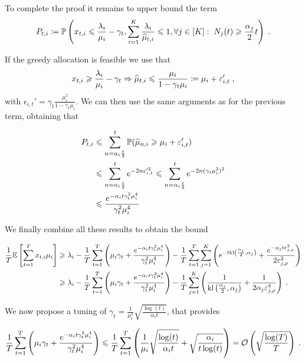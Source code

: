 To complete the proof it remains to upper bound the term \[P_{t,i} \coloneqq \mathbb{P}\left(x_{t,i}\leqslant \frac{\lambda_i}{\mu_i}-\gamma_t, \sum_{i=1}^K \frac{\lambda_i}{\widehat{\mu}_{t, i}}\leqslant 1, \forall j \in [K]:\; N_j(t)\geqslant \frac{\alpha_j}{2}t\right) \;.\]

If the greedy allocation is feasible we use that
\[x_{t,i} \geqslant \frac{\lambda_i}{\mu_i} - \gamma_t \Rightarrow \widehat{\mu}_{t,i} \leqslant \frac{\mu_i}{1-\gamma_t \mu_i} \coloneqq \mu_i + \varepsilon_{i, t}' \;, \]
with $\epsilon_{i, t}'= \gamma_t \frac{\mu_i^2}{1-\gamma_t\mu_i}$. We can then use the same arguments as for the previous term, obtaining that 

\begin{align*}
P_{t,i} &\leqslant \sum_{n = \alpha_i \frac{t}{2}}^t \mathbb{P}(\widehat{\mu}_{n,i}\geqslant \mu_i + \varepsilon_{i, t}') \\
& \leqslant \sum_{n = \alpha_i \frac{t}{2}}^t e^{-2n \varepsilon_{i, t}'^2} \leqslant \sum_{n = \alpha_i \frac{t}{2}}^t e^{-2n (\gamma_t \mu_i^2)^2} \\
& \leqslant \frac{e^{-\alpha_i t \gamma_t^2 \mu_i^4}}{\gamma_t^2 \mu_i^4}
\end{align*}

We finally combine all these results to obtain the bound 

\begin{align*} 
\frac{1}{T} \mathbb{E}\left[\sum_{t=1}^T x_{t,i} \mu_i \right] &\geqslant \lambda_i - \frac{1}{T} \sum_{t=1}^T \left(\mu_i \gamma_t + \frac{e^{-\alpha_i t \gamma_t^2 \mu_i^4}}{\gamma_t^2 \mu_i^4}\right) - \frac{1}{T} \sum_{t=1}^T  \sum_{j=1}^K \left(e^{-t \text{\normalfont kl}\left(\frac{\alpha_j}{2}, \alpha_j\right)}+ \frac{e^{-\alpha_j t \varepsilon_{j, \rho}^2}}{2\varepsilon_{j, \rho}^2}\right) \\
& \geqslant \lambda_i - \frac{1}{T} \sum_{t=1}^T \left(\mu_i \gamma_t + \frac{e^{-\alpha_i t \gamma_t^2 \mu_i^4}}{\gamma_t^2 \mu_i^4}\right) - \frac{1}{T}\sum_{j=1}^K \left(\frac{1}{\text{\normalfont kl}\left(\frac{\alpha_j}{2}, \alpha_j\right)}+ \frac{1}{2 \alpha_j \varepsilon_{j, \rho}^4}\right) \;.
\end{align*}

We now propose a tuning of $\gamma_t = \frac{1}{\mu_i^2}\sqrt{\frac{\log(t)}{\alpha_i t}}$, that provides 

\[\frac{1}{T} \sum_{t=1}^T \left(\mu_i \gamma_t + \frac{e^{-\alpha_i t \gamma_t^2 \mu_i^4}}{\gamma_t^2 \mu_i^4}\right) \leqslant \frac{1}{T} \sum_{t=1}^T \left(\frac{1}{\mu_i}\sqrt{\frac{\log(t)}{\alpha_i t}} + \sqrt{\frac{\alpha_i}{t \log(t)}}\right) = \mathcal{O}\left(\sqrt{\frac{\log(T)}{T}}\right) \;. \]

